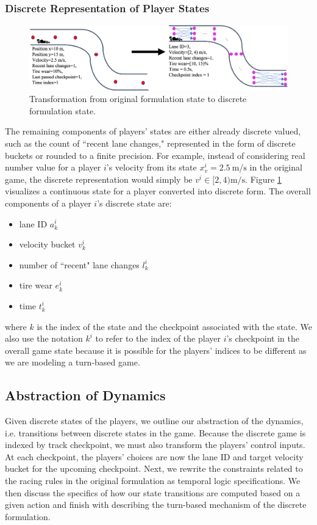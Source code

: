 \subsubsection{Discrete Representation of Player States}
\begin{figure}
\begin{center}
   \includegraphics[width=\textwidth]{Figures/StateTransformation.png}
\caption{Transformation from original formulation state to discrete formulation state.}
\label{fig:state_transform}
\end{center}
\end{figure}
The remaining components of players' states are either already discrete valued, such as the count of ``recent lane changes," represented in the form of discrete buckets or rounded to a finite precision. For example, instead of considering real number value for a player $i$'s velocity from its state $x^i_v=\SI{2.5}{\meter\per\second}$ in the original game, the discrete representation would simply be $v^i \in [2, 4)\si{\meter\per\second}$. Figure \ref{fig:state_transform} visualizes a continuous state for a player converted into discrete form. The overall components of a player $i$'s discrete state are:
\begin{itemize}
    \item lane ID $a^i_k$
    \item velocity bucket $v^i_k$
    \item number of ``recent" lane changes $l^i_k$
    \item tire wear $e^i_k$
    \item time $t^i_k$
\end{itemize}
where $k$ is the index of the state and the checkpoint associated with the state. We also use the notation $k^i$ to refer to the index of the player $i$'s checkpoint in the overall game state because it is possible for the players' indices to be different as we are modeling a turn-based game.

\subsection{Abstraction of Dynamics} \label{section:discdyn}
Given discrete states of the players, we outline our abstraction of the dynamics, i.e. transitions between discrete states in the game. Because the discrete game is indexed by track checkpoint, we must also transform the players' control inputs. At each checkpoint, the players' choices are now the lane ID and target velocity bucket for the upcoming checkpoint. Next, we rewrite the constraints related to the racing rules in the original formulation as temporal logic specifications. We then discuss the specifics of how our state transitions are computed based on a given action and finish with describing the turn-based mechanism of the discrete formulation.

